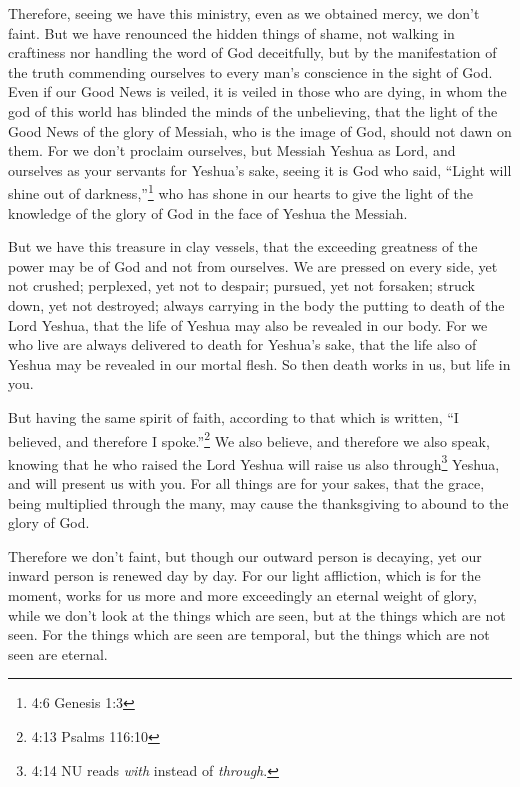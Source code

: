 \mychapter{} \myverse*{}Therefore, seeing we have this ministry, even as we obtained mercy,
we don’t faint.
\myverse{}But we have renounced the hidden things of shame, not walking in craftiness
nor handling the word of God deceitfully, but by the manifestation of the truth commending ourselves to
every man’s conscience in the sight of God.
\myverse{}Even if our Good News is veiled, it is veiled in those who are dying,
\myverse{}in whom the god of this world has blinded the minds of the unbelieving, that
the light of the Good News of the glory of Messiah, who is the image of God, should not dawn on them.
\myverse{}For we don’t proclaim ourselves, but Messiah Yeshua as Lord, and ourselves as
your servants for Yeshua’s sake,
\myverse{}seeing it is God who said, “Light will shine out of darkness,”\footnote{4:6 Genesis 1:3} who has shone in our hearts to give the light of
the knowledge of the glory of God in the face of Yeshua the Messiah.

\myverse{}But we have this treasure in clay vessels, that the exceeding greatness
of the power may be of God and not from ourselves.
\myverse{}We are pressed on every side, yet not crushed; perplexed, yet not to despair;
\myverse{}pursued, yet not forsaken; struck down, yet not destroyed;
\myverse{}always carrying in the body the putting to death of the Lord Yeshua, that
the life of Yeshua may also be revealed in our body.
\myverse{}For we who live are always delivered to death for Yeshua’s sake, that the
life also of Yeshua may be revealed in our mortal flesh.
\myverse{}So then death works in us, but life in you.

\myverse{}But having the same spirit of faith, according to that which
is written, “I believed, and therefore I spoke.”\footnote{4:13 Psalms 116:10} We also believe, and therefore we also speak,
\myverse{}knowing that he who raised the Lord Yeshua will raise us also through\footnote{4:14 NU reads
	\textit{with} instead of \textit{through}.} Yeshua, and will present us with you.
\myverse{}For all things are for your sakes, that the grace, being multiplied through
the many, may cause the thanksgiving to abound to the glory of God.

\myverse{}Therefore we don’t faint, but though our outward person is decaying,
yet our inward person is renewed day by day.
\myverse{}For our light affliction, which is for the moment, works for us more and more
exceedingly an eternal weight of glory,
\myverse{}while we don’t look at the things which are seen, but at the things which
are not seen. For the things which are seen are temporal, but the things which are not seen are eternal.


